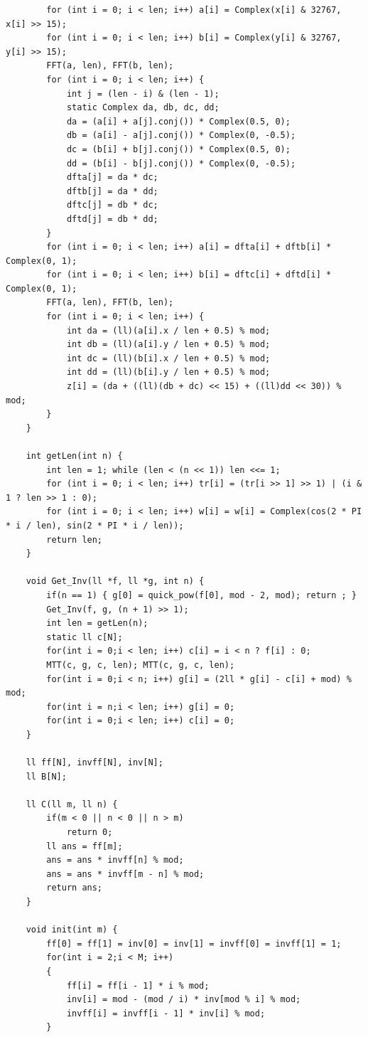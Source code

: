 \documentclass[twoside]{article}
\begin{document}
\begin{lstlisting}
        for (int i = 0; i < len; i++) a[i] = Complex(x[i] & 32767, x[i] >> 15);
        for (int i = 0; i < len; i++) b[i] = Complex(y[i] & 32767, y[i] >> 15);
        FFT(a, len), FFT(b, len);
        for (int i = 0; i < len; i++) {
            int j = (len - i) & (len - 1);
            static Complex da, db, dc, dd;
            da = (a[i] + a[j].conj()) * Complex(0.5, 0);
            db = (a[i] - a[j].conj()) * Complex(0, -0.5);
            dc = (b[i] + b[j].conj()) * Complex(0.5, 0);
            dd = (b[i] - b[j].conj()) * Complex(0, -0.5);
            dfta[j] = da * dc;
            dftb[j] = da * dd;
            dftc[j] = db * dc;
            dftd[j] = db * dd;
        }
        for (int i = 0; i < len; i++) a[i] = dfta[i] + dftb[i] * Complex(0, 1);
        for (int i = 0; i < len; i++) b[i] = dftc[i] + dftd[i] * Complex(0, 1);
        FFT(a, len), FFT(b, len);
        for (int i = 0; i < len; i++) {
            int da = (ll)(a[i].x / len + 0.5) % mod;
            int db = (ll)(a[i].y / len + 0.5) % mod;
            int dc = (ll)(b[i].x / len + 0.5) % mod;
            int dd = (ll)(b[i].y / len + 0.5) % mod;
            z[i] = (da + ((ll)(db + dc) << 15) + ((ll)dd << 30)) % mod;
        }
    }

    int getLen(int n) {
        int len = 1; while (len < (n << 1)) len <<= 1;
        for (int i = 0; i < len; i++) tr[i] = (tr[i >> 1] >> 1) | (i & 1 ? len >> 1 : 0);
        for (int i = 0; i < len; i++) w[i] = w[i] = Complex(cos(2 * PI * i / len), sin(2 * PI * i / len));
        return len;
    }

    void Get_Inv(ll *f, ll *g, int n) {
        if(n == 1) { g[0] = quick_pow(f[0], mod - 2, mod); return ; }
        Get_Inv(f, g, (n + 1) >> 1);
        int len = getLen(n);
        static ll c[N];
        for(int i = 0;i < len; i++) c[i] = i < n ? f[i] : 0;
        MTT(c, g, c, len); MTT(c, g, c, len);
        for(int i = 0;i < n; i++) g[i] = (2ll * g[i] - c[i] + mod) % mod;
        for(int i = n;i < len; i++) g[i] = 0;
        for(int i = 0;i < len; i++) c[i] = 0;
    }

    ll ff[N], invff[N], inv[N];
    ll B[N];

    ll C(ll m, ll n) {
        if(m < 0 || n < 0 || n > m)
            return 0;
        ll ans = ff[m];
        ans = ans * invff[n] % mod;
        ans = ans * invff[m - n] % mod;
        return ans;
    }

    void init(int m) {
        ff[0] = ff[1] = inv[0] = inv[1] = invff[0] = invff[1] = 1;
        for(int i = 2;i < M; i++)
        {
            ff[i] = ff[i - 1] * i % mod;
            inv[i] = mod - (mod / i) * inv[mod % i] % mod;
            invff[i] = invff[i - 1] * inv[i] % mod;
        }


\end{lstlisting}
\end{document}
